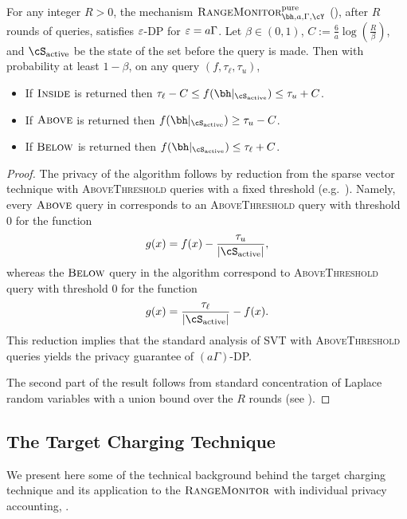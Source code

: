 \begin{proposition}\label{prop:oim-pure-dp}
For any integer $R > 0$, the mechanism
$\OutsideIntervalMonitor^{\mathrm{pure}}_{\bh, a, \Gamma, \cY}$ (), after $R$ rounds of queries, satisfies $\varepsilon$-DP for $\varepsilon = a\Gamma$.
Let $\beta \in (0, 1)$, $C := \frac6a \log(\frac{R}{\beta})$, and $\Sactive$ be the state of the set before the query is made. Then with probability at least $1-\beta$, on any query $(f, \tau_{\ell}, \tau_{u})$,
\begin{itemize}[topsep=3pt,itemsep=-3pt]
    \item If $\textsc{Inside}$ is returned then $\tau_{\ell} - C \le f(\bh|_{\Sactive}) \le \tau_u + C$.
    \item If $\textsc{Above}$ is returned then $f(\bh|_{\Sactive}) \ge \tau_u - C$.
    \item If $\textsc{Below}$ is returned then $f(\bh|_{\Sactive}) \le \tau_{\ell} + C$.
\end{itemize}
\end{proposition}



\begin{proof}
The privacy of the algorithm follows by reduction from the sparse vector technique with \textsc{AboveThreshold} queries with a fixed threshold (e.g.~\cite{DworkR14}).
Namely, every $\textsc{Above}$ query in  corresponds to an \textsc{AboveThreshold} query with threshold 0 for the function
\[ g(x)=f(x)-\frac{\tau_u}{|\Sactive|},\]
whereas the $\textsc{Below}$ query in the algorithm correspond to \textsc{AboveThreshold} query with threshold 0 for the function
\[ g(x)=\frac{\tau_{\ell}}{|\Sactive|}-f(x).\]
This reduction implies that the standard analysis of SVT with \textsc{AboveThreshold} queries yields the privacy guarantee of $(a\Gamma)$-DP.

The second part of the result follows from standard concentration of Laplace random variables with a union bound over the $R$ rounds (see ).
\end{proof}

\subsection{The Target Charging Technique}

\label{app:TCT}

We present here some of the technical background behind the target charging technique and its application to the $\textsc{RangeMonitor}$ with individual privacy accounting, .

